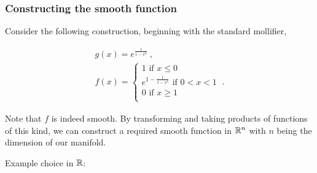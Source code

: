 \begin{frame}
    \frametitle{Constructing the smooth function}

    Consider the following construction, beginning with the standard mollifier, 
    
    \begin{gather*}
        g(x) = e^{\frac{1}{1-x^2}}~, \\
        f(x) = \begin{cases}
            1 \text{ if } x \leq 0 \\
            e^{1 - \frac{1}{1-x^2}} \text{ if } 0 < x < 1 \\
            0 \text{ if } x \geq 1 \\
        \end{cases}~.
    \end{gather*} \pause

    Note that \(f\) is indeed smooth. By transforming and taking products of
    functions of this kind, we can construct a required smooth function in
    \(\mathbb{R}^n\) with \(n\) being the dimension of our manifold.

\end{frame}

\begin{frame}

    Example choice in \(\mathbb{R}\):
    
    \begin{center}
    \end{center}

\end{frame}

